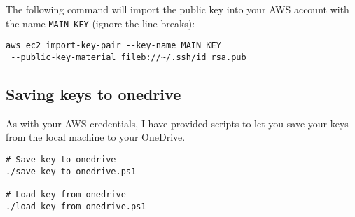 The following command will import the public key into your AWS account with the name \texttt{MAIN\_KEY} (ignore the line breaks):
\begin{verbatim}
aws ec2 import-key-pair --key-name MAIN_KEY
 --public-key-material fileb://~/.ssh/id_rsa.pub 
\end{verbatim}

\subsection{Saving keys to onedrive}

As with your AWS credentials, I have provided scripts to let you save your keys from the local machine to your OneDrive.
\begin{verbatim}
# Save key to onedrive
./save_key_to_onedrive.ps1

# Load key from onedrive
./load_key_from_onedrive.ps1
\end{verbatim}


